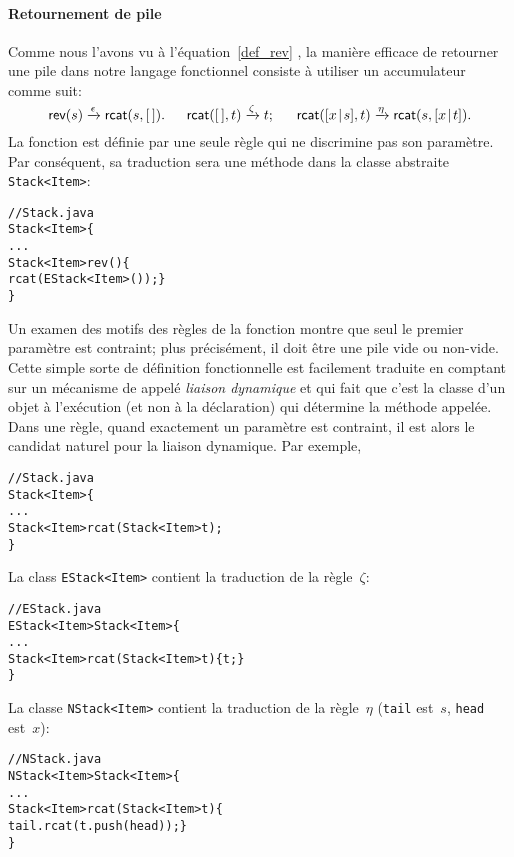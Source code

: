 \paragraph{Retournement de pile}

Comme nous l'avons vu à l'équation~\eqref{def_rev} ,
la manière efficace de retourner une pile dans notre langage
fonctionnel consiste à utiliser un accumulateur comme suit:
\begin{equation*}
\textsf{rev}(s) \xrightarrow{\smash{\epsilon}}
             \textsf{rcat}(s,[\,]).\quad\;\;
\textsf{rcat}([\,],t) \xrightarrow{\smash{\zeta}} t;\quad\;\;
\textsf{rcat}([{x}\!\mid\!{s}],t) \xrightarrow{\smash{\eta}} 
                          \textsf{rcat}(s,[{x}\!\mid\!{t}]).
\end{equation*}
La fonction  est définie par une seule règle qui ne
discrimine pas son paramètre. Par conséquent, sa traduction sera une
méthode dans la classe abstraite \texttt{Stack<Item>}:
\begin{alltt}
// Stack.java
\public \abstractX \class Stack<Item> \{
  ...
  \public Stack<Item> rev() \{
    \return rcat(\new EStack<Item>()); \}
\}
\end{alltt}
Un examen des motifs des règles de la fonction  montre que
seul le premier paramètre est contraint; plus précisément, il doit
être une pile vide ou non-vide. Cette simple sorte de définition
fonctionnelle est facilement traduite en comptant sur un mécanisme de
\Java appelé \emph{liaison dynamique} et qui fait que c'est la classe
d'un objet à l'exécution (et non à la déclaration) qui détermine la
méthode appelée. Dans une règle, quand exactement un paramètre est
contraint, il est alors le candidat naturel pour la liaison
dynamique. Par exemple,
\begin{alltt}
// Stack.java
\public \abstractX \class Stack<Item> \{
  ...
  \public \abstractX Stack<Item> rcat(\final Stack<Item> t);
\}
\end{alltt}
La class \texttt{EStack<Item>} contient la traduction de la règle~\(\zeta\):
\begin{alltt}
// EStack.java
\public \final \class EStack<Item> \extends Stack<Item> \{
  ...
  \public Stack<Item> rcat(\final Stack<Item> t) \{ \return t; \}
\}
\end{alltt}
La classe \texttt{NStack<Item>} contient la traduction de la
règle~\(\eta\) (\texttt{tail} est~\(s\), \texttt{head} est~\(x\)):
\begin{alltt}
// NStack.java
\public \final \class NStack<Item> \extends Stack<Item> \{
  ...
  \public Stack<Item> rcat(\final Stack<Item> t) \{
    \return tail.rcat(t.push(head)); \}
\}
\end{alltt}


